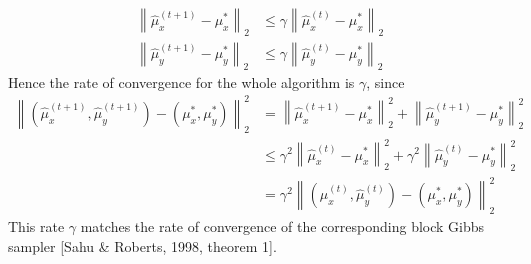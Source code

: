 \documentclass{article}
\begin{document}
\begin{align}
\left\|\widehat\mu_x^{(t+1)}-\mu_x^*\right\|_2
&\le \gamma\left\|\widehat\mu_x^{(t)}-\mu_x^*\right\|_2 \\
\left\|\widehat\mu_y^{(t+1)}-\mu_y^*\right\|_2
&\le \gamma\left\|\widehat\mu_y^{(t)}-\mu_y^*\right\|_2
\end{align}
Hence the rate of convergence for the whole algorithm is $\gamma$, since
\begin{align}
\left\|(\widehat\mu_x^{(t+1)},\widehat\mu_y^{(t+1)})-(\mu_x^*,\mu_y^*)\right\|_2^2
&=\left\|\widehat\mu_x^{(t+1)}-\mu_x^*\right\|_2^2 + \left\|\widehat\mu_y^{(t+1)}-\mu_y^*\right\|_2^2\\
&\le \gamma^2\left\|\widehat\mu_x^{(t)}-\mu_x^*\right\|_2^2 + \gamma^2\left\|\widehat\mu_y^{(t)}-\mu_y^*\right\|_2^2 \\
&= \gamma^2\left\|(\widehat\mu_x^{(t)},\widehat\mu_y^{(t)})-(\mu_x^*,\mu_y^*)\right\|_2^2 
\end{align}
This rate $\gamma$ matches the rate of convergence of the corresponding block Gibbs sampler [Sahu \& Roberts, 1998, theorem 1].
\end{document}

